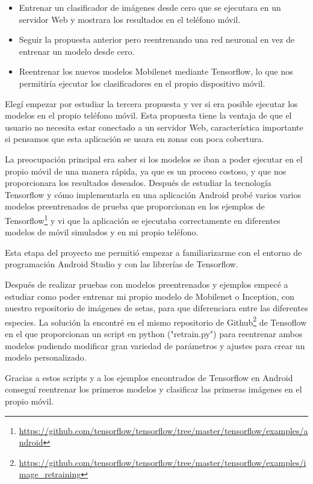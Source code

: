 \begin{itemize}
	\item Entrenar un clasificador de imágenes desde cero que se ejecutara en un servidor Web y mostrara los resultados en el teléfono móvil.
	\item Seguir la propuesta anterior pero reentrenando una red neuronal en vez de entrenar un modelo desde cero.
	\item Reentrenar los nuevos modelos Mobilenet mediante Tensorflow, lo que nos permitiría ejecutar los clasificadores en el propio dispositivo móvil.
\end{itemize}

Elegí empezar por estudiar la tercera propuesta y ver si era posible ejecutar los modelos en el propio teléfono móvil. Esta propuesta tiene la ventaja de que el usuario no necesita estar conectado a un servidor Web, característica importante si pensamos que esta aplicación se usara en zonas con poca cobertura.

La preocupación principal era saber si los modelos se iban a poder ejecutar en el propio móvil de una manera rápida, ya que es un proceso costoso, y que nos proporcionara los resultados deseados. Después de estudiar la tecnología Tensorflow y cómo implementarla en una aplicación Android probé varios varios modelos preentrenados de prueba que proporcionan en los ejemplos de Tensorflow\footnote{\url{https://github.com/tensorflow/tensorflow/tree/master/tensorflow/examples/android}} y vi que la aplicación se ejecutaba correctamente en diferentes modelos de móvil simulados y en mi propio teléfono.

Esta etapa del proyecto me permitió empezar a familiarizarme con el entorno de programación Android Studio y con las librerías de Tensorflow.

Después de realizar pruebas con modelos preentrenados y ejemplos empecé a estudiar como poder entrenar mi propio modelo de Mobilenet o Inception, con nuestro repositorio de imágenes de setas, para que diferenciara entre las diferentes especies. La solución la encontré en el mismo repositorio de Github\footnote{\url{https://github.com/tensorflow/tensorflow/tree/master/tensorflow/examples/image_retraining}} de Tensoflow en el que proporcionan un script en python ("retrain.py") para reentrenar ambos modelos pudiendo modificar gran variedad de parámetros y ajustes para crear un modelo personalizado.

Gracias a estos scripts y a los ejemplos encontrados de Tensorflow en Android conseguí reentrenar los primeros modelos y clasificar las primeras imágenes en el propio móvil.


